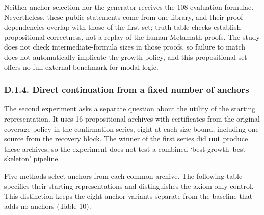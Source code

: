 \documentclass[pdflatex,sn-basic,Numbered]{sn-jnl}
\begin{document}
Neither anchor selection nor the generator receives the 108 evaluation formulae. Nevertheless, these public statements come from one library, and their proof dependencies overlap with those of the first set; truth-table checks establish propositional correctness, not a replay of the human Metamath proofs. The study does not check intermediate-formula sizes in those proofs, so failure to match does not automatically implicate the growth policy, and this propositional set offers no full external benchmark for modal logic.

\subsubsection*{D.1.4. Direct continuation from a fixed number of anchors}\label{d.1.4.-direct-continuation-from-a-fixed-number-of-anchors}

The second experiment asks a separate question about the utility of the starting representation. It uses 16 propositional archives with certificates from the original coverage policy in the confirmation series, eight at each size bound, including one source from the recovery block. The winner of the first series did \textbf{not} produce these archives, so the experiment does not test a combined `best growth--best skeleton' pipeline.

Five methods select anchors from each common archive. The following table specifies their starting representations and distinguishes the axiom-only control. This distinction keeps the eight-anchor variants separate from the baseline that adds no anchors (Table 10).

\begingroup
\small
\setlength{\tabcolsep}{3pt}
\renewcommand{\arraystretch}{1.13}
\end{document}
